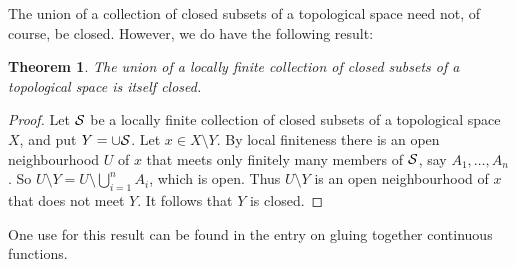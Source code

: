 \documentclass[12pt]{article}
\newtheorem*{thm*}{Theorem}
\begin{document}

The union of a collection of closed subsets of a topological space need not,
of course, be closed. However, we do have the following result:

\begin{thm*}
The union of a locally finite collection of closed subsets
of a topological space is itself closed.
\end{thm*}

\begin{proof}
Let $\cal S$ be a locally finite collection of closed subsets
of a topological space $X$, and put $Y=\cup\cal S$.
Let $x\in X\setminus Y$.
By local finiteness there is an open neighbourhood $U$ of $x$
that meets only finitely many members of $\cal S$,
say $A_1,\dots,A_n$.
So $U\setminus Y=U\setminus\bigcup_{i=1}^n A_i$, which is open.
Thus $U\setminus Y$ is an open neighbourhood of $x$ that does not meet $Y$.
It follows that $Y$ is closed.
\end{proof}

One use for this result can be found in the entry on gluing together continuous functions.
\end{document}
